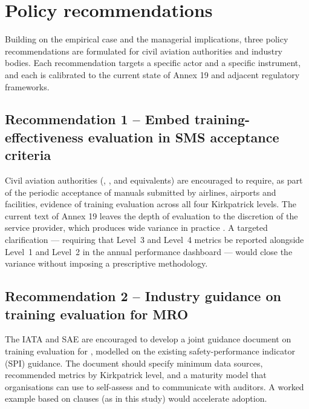 \section{Policy recommendations}
\label{sec:policy}

Building on the empirical case and the managerial implications, three
policy recommendations are formulated for civil aviation authorities and
industry bodies. Each recommendation targets a specific actor and a
specific instrument, and each is calibrated to the current state of \ICAO{}
Annex 19 and adjacent regulatory frameworks.

\subsection{Recommendation 1 -- Embed training-effectiveness evaluation in SMS acceptance criteria}
\label{subsec:pol-rec1}

Civil aviation authorities (\FAA{}, \EASA{}, \ANAC{} and equivalents) are
encouraged to require, as part of the periodic acceptance of \SMS{} manuals
submitted by airlines, airports and \MRO{} facilities, evidence of training
evaluation across all four Kirkpatrick levels. The current text of
\ICAO{} Annex 19 leaves the depth of evaluation to the discretion of the
service provider, which produces wide variance in practice
\citep{Nakamura2024,ORconnor2024}. A targeted clarification --- requiring
that Level~3 and Level~4 metrics be reported alongside Level~1 and Level~2
in the annual \SMS{} performance dashboard --- would close the variance
without imposing a prescriptive methodology.

\subsection{Recommendation 2 -- Industry guidance on training evaluation for MRO}
\label{subsec:pol-rec2}

The IATA and SAE are encouraged to develop a joint
guidance document on training evaluation for \MRO{}, modelled on the
existing safety-performance indicator (SPI) guidance. The
document should specify minimum data sources, recommended metrics by
Kirkpatrick level, and a maturity model that organisations can use to
self-assess and to communicate with auditors. A worked example based on
\AS{} clauses (as in this study) would accelerate adoption.

